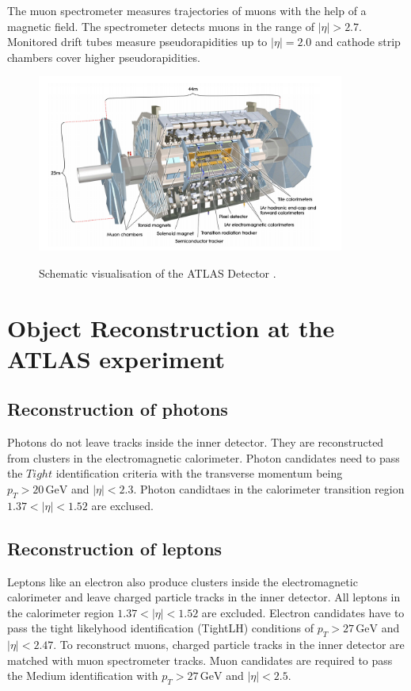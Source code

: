 The muon spectrometer measures trajectories of muons with the help of a magnetic field. The spectrometer detects muons in the range of $\bigl|\eta\bigr| > 2.7$. 
Monitored drift tubes measure pseudorapidities up to $|\eta| = 2.0$ and cathode strip chambers cover higher pseudorapidities.  
\begin{figure}
    \centering
    \includegraphics[width=0.9\textwidth]{Plots/atlasSCHEMA.PNG}
    \label{fig:atlasschema}
    \caption{Schematic visualisation of the ATLAS Detector \cite{Collaboration_2008}.}
\end{figure}



\section{Object Reconstruction at the ATLAS experiment}

\subsection{Reconstruction of photons}
\label{sec:reconphoton}

Photons do not leave tracks inside the inner detector. They are reconstructed from clusters in the electromagnetic calorimeter. Photon candidates need to pass the $Tight$ identification criteria with the transverse momentum being $p_T >20\,\si{\giga\electronvolt}$ and $|\eta| < 2.3$. 
Photon candidtaes in the calorimeter transition region $1.37 < |\eta| < 1.52$ are exclused. 

\subsection{Reconstruction of leptons}
\label{sec:reconlepton}

Leptons like an electron also produce clusters inside the electromagnetic calorimeter and leave charged particle tracks in the inner detector. All leptons in the calorimeter region $1.37 < |\eta| < 1.52$ are excluded. Electron candidates have to pass the tight likelyhood identification (TightLH) conditions of $p_T > 27 \,\si{\giga\electronvolt}$ and $|\eta| < 2.47$. 
To reconstruct muons, charged particle tracks in the inner detector are matched with muon spectrometer tracks. Muon candidates are required to pass the Medium identification with $p_T > 27 \,\si{\giga\electronvolt}$ and $|\eta| < 2.5$.

